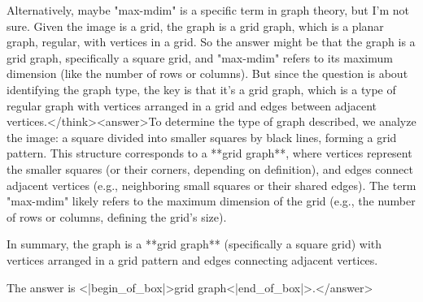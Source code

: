 Alternatively, maybe "max-mdim" is a specific term in graph theory, but I'm not sure. Given the image is a grid, the graph is a grid graph, which is a planar graph, regular, with vertices in a grid. So the answer might be that the graph is a grid graph, specifically a square grid, and "max-mdim" refers to its maximum dimension (like the number of rows or columns). But since the question is about identifying the graph type, the key is that it's a grid graph, which is a type of regular graph with vertices arranged in a grid and edges between adjacent vertices.</think><answer>To determine the type of graph described, we analyze the image: a square divided into smaller squares by black lines, forming a grid pattern. This structure corresponds to a **grid graph**, where vertices represent the smaller squares (or their corners, depending on definition), and edges connect adjacent vertices (e.g., neighboring small squares or their shared edges). The term "max-mdim" likely refers to the maximum dimension of the grid (e.g., the number of rows or columns, defining the grid's size).  

In summary, the graph is a **grid graph** (specifically a square grid) with vertices arranged in a grid pattern and edges connecting adjacent vertices.  

The answer is <|begin_of_box|>grid graph<|end_of_box|>.</answer>